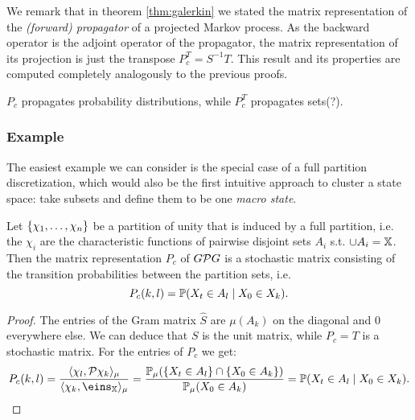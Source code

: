 \begin{rem}
We remark that in theorem \ref{thm:galerkin} we stated the matrix representation of the \textit{(forward) propagator} of a projected Markov process. As the backward operator is the adjoint operator of the propagator,
the matrix representation of its projection is just the transpose $P_c^T = S^{-1}T$.
This result and its properties are computed completely analogously to the previous proofs.

$P_c$ propagates probability distributions, while $P_c^T$ propagates sets(?).
\end{rem}

\subsubsection*{Example}

The easiest example we can consider is the special case of a full partition discretization, which would also be the first intuitive approach to cluster a state space: take subsets and define them to be one \textit{macro state}.

\begin{ex}
Let $\{ \chi_1,\dots,\chi_n \}$ be a partition of unity that is induced by a full partition, i.e. the $\chi_i$ are the characteristic functions of pairwise disjoint sets $A_i$ s.t. $\cup A_i = \mathbb{X}$. Then the matrix representation $P_c$ of $G\mathcal{P} G$ is a stochastic matrix consisting of the transition probabilities between the partition sets, i.e.
\begin{equation*}
P_c(k,l) = \mathbb{P}(X_t \in A_l \mid X_0 \in X_k).
\end{equation*}
\end{ex}

\begin{proof}
The entries of the Gram matrix $\hat{S}$ are $\mu(A_k)$ on the diagonal and $0$ everywhere else.
We can deduce that $S$ is the unit matrix, while $P_c=T$ is a stochastic matrix. 
For the entries of $P_c$ we get:
\begin{equation*}
P_c(k,l)=
\frac{\langle \chi_l, \Pcal \chi_k \rangle_\mu}{\langle \chi_k, \eins_\X \rangle_\mu}
= \frac{\Prob_\mu (\{X_t \in A_l\} \cap \{X_0 \in A_k\})}{\Prob_\mu(X_0 \in A_k)}
= \Prob(X_t \in A_l \mid X_0 \in X_k).
\end{equation*}
\end{proof}

